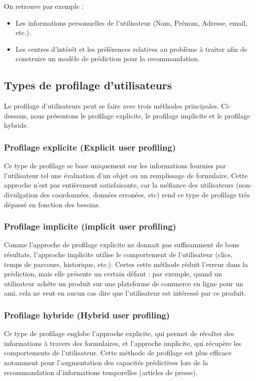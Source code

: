 On retrouve par exemple :
\begin{itemize}
    \item Les informations personnelles de l'utilisateur (Nom, Prénom, Adresse, email, etc.).
    \item Les centres d'intérêt et les préférences relatives au problème à traiter afin de construire un modèle de prédiction pour la recommandation.
\end{itemize}

\subsection{Types de profilage d'utilisateurs}
Le profilage d'utilisateurs peut se faire avec trois méthodes principales. Ci-dessous, nous présentons le profilage explicite, le profilage implicite et le profilage hybride.

\subsubsection{Profilage explicite (Explicit user profiling)}
Ce type de profilage se base uniquement sur les informations fournies par l'utilisateur tel une évaluation d'un objet ou un remplissage de formulaire. Cette approche n'est pas entièrement satisfaisante, car la méfiance des utilisateurs (non-divulgation des coordonnées, données erronées, etc) rend ce type de profilage très dépassé en fonction des besoins.

\subsubsection{Profilage implicite (implicit user profiling)}
Comme l'approche de profilage explicite ne donnait pas suffisamment de bons résultats, l'approche implicite utilise le comportement de l'utilisateur (clics, temps de parcours, historique, etc.). Certes cette méthode réduit l'erreur dans la prédiction, mais elle présente un certain défaut : par exemple, quand un utilisateur achète un produit sur une plateforme de commerce en ligne pour un ami, cela ne veut en aucun cas dire que l'utilisateur est intéressé par ce produit.

\subsubsection{Profilage hybride (Hybrid user profiling)}
Ce type de profilage englobe l'approche explicite, qui permet de récolter des informations à travers des formulaires, et l'approche implicite, qui récupère les comportements de l'utilisateur. Cette méthode de profilage est plus efficace notamment pour l'augmentation des capacités prédictives lors de la recommandation d'informations temporelles (articles de presse).

